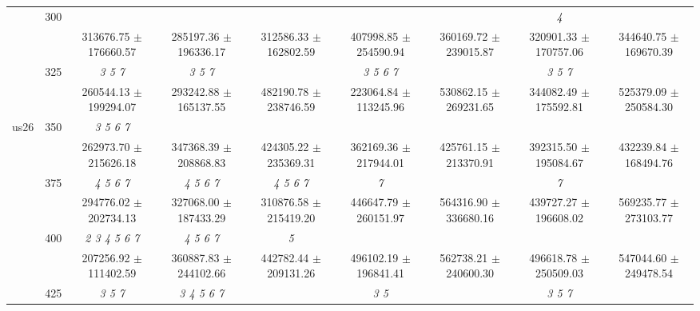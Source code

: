 \begin{table}[h]
{\begin{tabular}{
        ccccccccc}
 & \multirow{2}{*}{300}& & & & & & \textit{ 4 }&  \\ 
 & & 313676.75 $\pm$ 176660.57& 285197.36 $\pm$ 196336.17& 312586.33 $\pm$ 162802.59& 407998.85 $\pm$ 254590.94& 360169.72 $\pm$ 239015.87& 320901.33 $\pm$ 170757.06& 344640.75 $\pm$ 169670.39 \\ 
 & \multirow{2}{*}{325}& \cellcolor[HTML]{EFEFEF} \textit{ 3 5 7 }& \cellcolor[HTML]{EFEFEF} \textit{ 3 5 7 }& \cellcolor[HTML]{EFEFEF} & \cellcolor[HTML]{EFEFEF} \textit{ 3 5 6 7 }& \cellcolor[HTML]{EFEFEF} & \cellcolor[HTML]{EFEFEF} \textit{ 3 5 7 }& \cellcolor[HTML]{EFEFEF}  \\ 
 & & \cellcolor[HTML]{EFEFEF} 260544.13 $\pm$ 199294.07& \cellcolor[HTML]{EFEFEF} 293242.88 $\pm$ 165137.55& \cellcolor[HTML]{EFEFEF} 482190.78 $\pm$ 238746.59& \cellcolor[HTML]{EFEFEF} 223064.84 $\pm$ 113245.96& \cellcolor[HTML]{EFEFEF} 530862.15 $\pm$ 269231.65& \cellcolor[HTML]{EFEFEF} 344082.49 $\pm$ 175592.81& \cellcolor[HTML]{EFEFEF} 525379.09 $\pm$ 250584.30 \\ 
 \multirow{4}{*}{us26} & \multirow{2}{*}{350}& \textit{ 3 5 6 7 }& & & & & &  \\ 
 & & 262973.70 $\pm$ 215626.18& 347368.39 $\pm$ 208868.83& 424305.22 $\pm$ 235369.31& 362169.36 $\pm$ 217944.01& 425761.15 $\pm$ 213370.91& 392315.50 $\pm$ 195084.67& 432239.84 $\pm$ 168494.76 \\ 
 & \multirow{2}{*}{375}& \cellcolor[HTML]{EFEFEF} \textit{ 4 5 6 7 }& \cellcolor[HTML]{EFEFEF} \textit{ 4 5 6 7 }& \cellcolor[HTML]{EFEFEF} \textit{ 4 5 6 7 }& \cellcolor[HTML]{EFEFEF} \textit{ 7 }& \cellcolor[HTML]{EFEFEF} & \cellcolor[HTML]{EFEFEF} \textit{ 7 }& \cellcolor[HTML]{EFEFEF}  \\ 
 & & \cellcolor[HTML]{EFEFEF} 294776.02 $\pm$ 202734.13& \cellcolor[HTML]{EFEFEF} 327068.00 $\pm$ 187433.29& \cellcolor[HTML]{EFEFEF} 310876.58 $\pm$ 215419.20& \cellcolor[HTML]{EFEFEF} 446647.79 $\pm$ 260151.97& \cellcolor[HTML]{EFEFEF} 564316.90 $\pm$ 336680.16& \cellcolor[HTML]{EFEFEF} 439727.27 $\pm$ 196608.02& \cellcolor[HTML]{EFEFEF} 569235.77 $\pm$ 273103.77 \\ 
 & \multirow{2}{*}{400}& \textit{ 2 3 4 5 6 7 }& \textit{ 4 5 6 7 }& \textit{ 5 }& & & &  \\ 
 & & 207256.92 $\pm$ 111402.59& 360887.83 $\pm$ 244102.66& 442782.44 $\pm$ 209131.26& 496102.19 $\pm$ 196841.41& 562738.21 $\pm$ 240600.30& 496618.78 $\pm$ 250509.03& 547044.60 $\pm$ 249478.54 \\ 
 & \multirow{2}{*}{425}& \cellcolor[HTML]{EFEFEF} \textit{ 3 5 7 }& \cellcolor[HTML]{EFEFEF} \textit{ 3 4 5 6 7 }& \cellcolor[HTML]{EFEFEF} & \cellcolor[HTML]{EFEFEF} \textit{ 3 5 }& \cellcolor[HTML]{EFEFEF} & \cellcolor[HTML]{EFEFEF} \textit{ 3 5 7 }& \cellcolor[HTML]{EFEFEF}  \\ 

\end{tabular}}
\end{table}
